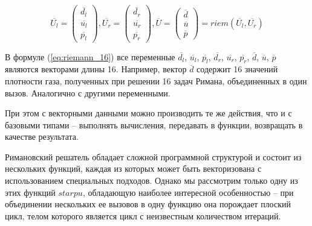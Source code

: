 \documentclass[
11pt,%
tightenlines,%
twoside,%
onecolumn,%
nofloats,%
nobibnotes,%
nofootinbib,%
superscriptaddress,%
noshowpacs,%
centertags]%
{revtex4}
\begin{document}
\begin{equation}\label{eq:riemann_16}
\overline{U_l} = \left( \begin{array}{ccc} \overline{d_l} \\ \overline{u_l} \\ \overline{p_l} \end{array} \right),
\overline{U_r} = \left( \begin{array}{ccc} \overline{d_r} \\ \overline{u_r} \\ \overline{p_r} \end{array} \right),
\overline{U} = \left( \begin{array}{ccc} \overline{d} \\ \overline{u} \\ \overline{p} \end{array} \right) = riem(\overline{U_l}, \overline{U_r})
\end{equation}

В формуле (\ref{eq:riemann_16}) все переменные $\overline{d_l}$, $\overline{u_l}$, $\overline{p_l}$, $\overline{d_r}$, $\overline{u_r}$, $\overline{p_r}$, $\overline{d}$, $\overline{u}$, $\overline{p}$ являются векторами длины 16.
Например, вектор $\overline{d}$ содержит 16 значений плотности газа, полученных при решении 16 задач Римана, объединенных в один вызов.
Аналогично с другими переменными.

При этом с векторными данными можно производить те же действия, что и с базовыми типами -- выполнять вычисления, передавать в функции, возвращать в качестве результата.

Римановский решатель обладает сложной программной структурой и состоит из нескольких функций, каждая из которых может быть векторизована с использованием специальных подходов.
Однако мы рассмотрим только одну из этих функций $starpu$, обладающую наиболее интересной особенностью -- при объединении нескольких ее вызовов в одну функцию она порождает плоский цикл, телом которого является цикл с неизвестным количеством итераций.
\end{document}
